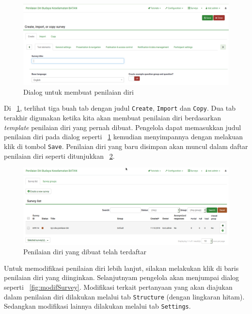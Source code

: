 \begin{figure}
  \begin{center}
    \includegraphics[scale=.35]{pics/proyekSurvey1.png}
    \caption{Dialog untuk membuat penilaian diri}
    \label{fig:proyekSurvey1}
  \end{center}
\end{figure}

Di \figurename~\ref{fig:proyekSurvey1}, terlihat tiga buah tab dengan judul \texttt{Create}, \texttt{Import} dan \texttt{Copy}. Dua tab terakhir digunakan ketika kita akan membuat penilaian diri berdasarkan \textit{template} penilaian diri yang pernah dibuat. Pengelola dapat memasukkan judul penilaian diri pada dialog seperti \figurename~\ref{fig:proyekSurvey1} kemudian menyimpannya dengan melakuan klik di tombol \texttt{Save}. Penilaian diri yang baru disimpan akan muncul dalam daftar penilaian diri seperti ditunjukkan \figurename~\ref{fig:daftarSurvey}.

\begin{figure}
  \begin{center}
    \includegraphics[scale=.35]{pics/daftarSurvey.png}
    \caption{Penilaian diri yang dibuat telah terdaftar}
    \label{fig:daftarSurvey}
  \end{center}
\end{figure}

Untuk memodifikasi penilaian diri lebih lanjut, silakan melakukan klik di baris penilaian diri yang diinginkan. Selanjutnyam pengelola akan menjumpai dialog seperti \figurename~\ref{fig:modifSurvey}. Modifikasi terkait pertanyaan yang akan diajukan dalam penilaian diri dilakukan melalui tab \texttt{Structure} (dengan lingkaran hitam). Sedangkan modifikasi lainnya dilakukan melalui tab \texttt{Settings}.

